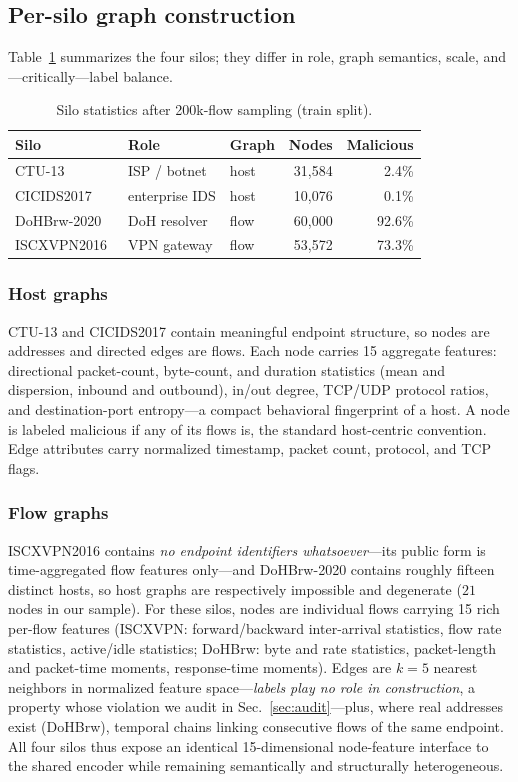 \documentclass[journal]{IEEEtran}
\begin{document}
\subsection{Per-silo graph construction}
\label{sec:graphs}
Table~\ref{tab:silos} summarizes the four silos; they differ in role,
graph semantics, scale, and---critically---label balance.

\begin{table}[!t]
\caption{Silo statistics after 200k-flow sampling (train split).}
\label{tab:silos}
\centering
\footnotesize
\setlength{\tabcolsep}{3.2pt}
\begin{tabular}{lllrr}
\toprule
Silo & Role & Graph & Nodes & Malicious \\
\midrule
CTU-13~\cite{ctu13}      & ISP / botnet      & host & 31{,}584 & 2.4\% \\
CICIDS2017~\cite{cicids} & enterprise IDS    & host & 10{,}076 & 0.1\% \\
DoHBrw-2020~\cite{dohbrw}& DoH resolver      & flow & 60{,}000 & 92.6\% \\
ISCXVPN2016~\cite{iscxvpn}& VPN gateway      & flow & 53{,}572 & 73.3\% \\
\bottomrule
\end{tabular}
\normalsize
\end{table}

\subsubsection{Host graphs}
CTU-13 and CICIDS2017 contain meaningful endpoint structure, so nodes
are addresses and directed edges are flows. Each node carries 15
aggregate features: directional packet-count, byte-count, and duration
statistics (mean and dispersion, inbound and outbound), in/out degree,
TCP/UDP protocol ratios, and destination-port entropy---a compact
behavioral fingerprint of a host. A node is labeled malicious if any
of its flows is, the standard host-centric convention. Edge attributes
carry normalized timestamp, packet count, protocol, and TCP flags.

\subsubsection{Flow graphs}
ISCXVPN2016 contains \emph{no endpoint identifiers whatsoever}---its
public form is time-aggregated flow features only---and DoHBrw-2020
contains roughly fifteen distinct hosts, so host graphs are
respectively impossible and degenerate ($21$ nodes in our sample).
For these silos, nodes are individual flows carrying 15 rich per-flow
features (ISCXVPN: forward/backward inter-arrival statistics, flow
rate statistics, active/idle statistics; DoHBrw: byte and rate
statistics, packet-length and packet-time moments, response-time
moments). Edges are $k{=}5$ nearest neighbors in normalized feature
space---\emph{labels play no role in construction}, a property whose
violation we audit in Sec.~\ref{sec:audit}---plus, where real
addresses exist (DoHBrw), temporal chains linking consecutive flows of
the same endpoint. All four silos thus expose an identical
15-dimensional node-feature interface to the shared encoder while
remaining semantically and structurally heterogeneous.
\end{document}
